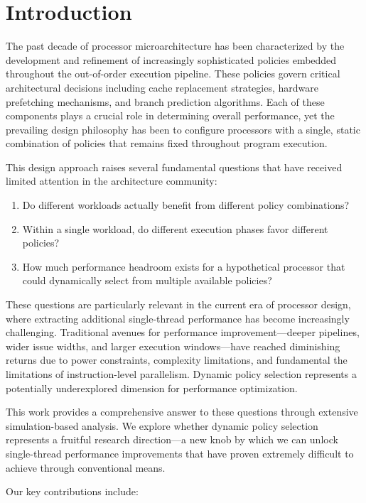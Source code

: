 \documentclass[conference]{IEEEtran}
\begin{document}
\section{Introduction}

The past decade of processor microarchitecture has been characterized by the development and refinement of increasingly sophisticated policies embedded throughout the out-of-order execution pipeline. These policies govern critical architectural decisions including cache replacement strategies, hardware prefetching mechanisms, and branch prediction algorithms. Each of these components plays a crucial role in determining overall performance, yet the prevailing design philosophy has been to configure processors with a single, static combination of policies that remains fixed throughout program execution.

This design approach raises several fundamental questions that have received limited attention in the architecture community:

\begin{enumerate}
\item Do different workloads actually benefit from different policy combinations?
\item Within a single workload, do different execution phases favor different policies?
\item How much performance headroom exists for a hypothetical processor that could dynamically select from multiple available policies?
\end{enumerate}

These questions are particularly relevant in the current era of processor design, where extracting additional single-thread performance has become increasingly challenging. Traditional avenues for performance improvement---deeper pipelines, wider issue widths, and larger execution windows---have reached diminishing returns due to power constraints, complexity limitations, and fundamental the limitations of instruction-level parallelism. Dynamic policy selection represents a potentially underexplored dimension for performance optimization.

This work provides a comprehensive answer to these questions through extensive simulation-based analysis. We explore whether dynamic policy selection represents a fruitful research direction---a new knob by which we can unlock single-thread performance improvements that have proven extremely difficult to achieve through conventional means.

Our key contributions include:
\end{document}
